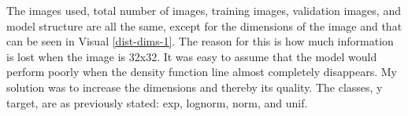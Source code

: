 \documentclass[12pt]{article}
\begin{document}
            \begin{table}[htp]

                \begin{center} 


                \caption{Model Information for all distribution graph classifiers}
                \label{dist-dims-1}

                \end{center}

            \end{table}

            The images used, total number of images, training images, validation images, 
            and model structure are all the same, except for the dimensions of the image and that can be seen in Visual \ref{dist-dims-1}.
            The reason for this is how much information is lost when the image is 32x32. 
            It was easy to assume that the model would perform poorly when the density function line almost completely disappears. 
            My solution was to increase the dimensions and thereby its quality. 
            The classes, y target, are as previously stated: exp, lognorm, norm, and unif.
        
\end{document}
